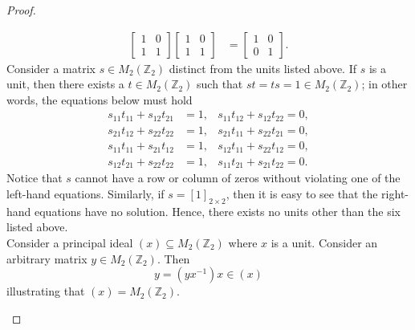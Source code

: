 \documentclass[ 12pt ]{article}
\begin{document}
\begin{enumerate}
\begin{proof}
\begin{enumerate}
\begin{align*}
					\begin{bmatrix} 1 & 0 \\ 1 & 1 \end{bmatrix} \begin{bmatrix} 1 & 0 \\ 1 & 1 \end{bmatrix} &= \begin{bmatrix} 1 & 0 \\ 0 & 1 \end{bmatrix}.
				\end{align*}
				Consider a matrix $s \in M_2(\mathbb{Z}_2)$ distinct from the units listed above. If $s$ is a unit, then there exists a $t \in M_2(\mathbb{Z}_2)$ such that $st = ts = 1 \in M_2(\mathbb{Z}_2)$; in other words, the equations below must hold
				\begin{align*}
					s_{11} t_{11} + s_{12} t_{21} &= 1, & s_{11} t_{12} + s_{12} t_{22} = 0, \\
					s_{21} t_{12} + s_{22} t_{22} &= 1, & s_{21} t_{11} + s_{22} t_{21} = 0, \\
					s_{11} t_{11} + s_{21} t_{12} &= 1, & s_{12} t_{11} + s_{22} t_{12} = 0, \\
					s_{12} t_{21} + s_{22} t_{22} &= 1, & s_{11} t_{21} + s_{21} t_{22} = 0.
				\end{align*}
				Notice that $s$ cannot have a row or column of zeros without violating one of the left-hand equations. Similarly, if $s = [1]_{2 \times 2}$, then it is easy to see that the right-hand equations have no solution. Hence, there exists no units other than the six listed above. \\

				Consider a principal ideal $(x) \subseteq M_2(\mathbb{Z}_2)$ where $x$ is a unit. Consider an arbitrary matrix $y \in M_2(\mathbb{Z}_2)$. Then $$y = (yx^{-1})x \in (x)$$ illustrating that $(x) = M_2(\mathbb{Z}_2)$.


\end{enumerate}
\end{proof}
\end{enumerate}
\end{document}
